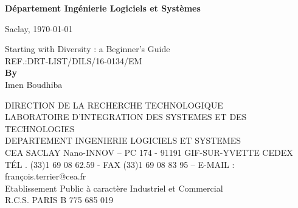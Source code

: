 \begin{titlepage}

\newcommand{\HRule}{\rule{\linewidth}{0.5mm}}



\bigskip
\bigskip


\begin{center}

\textbf{\LARGE Département Ingénierie Logiciels et Systèmes}\\[1.0cm] 

\begin{flushright}
Saclay, \today \\[1.0cm]
\end{flushright}

\LARGE Starting with Diversity : a Beginner's Guide \\[1.0cm]


\textsc{\Large REF.:DRT-LIST/DILS/16-0134/EM} \\[1.0cm]

\Large
\textbf{By}\\
Imen Boudhiba \\
\end{center}




\newenvironment{bottompar}{\par\vspace*{\fill}}{\clearpage}
\begin{bottompar}
\begin{center}
\textcolor{light-gray}{
\footnotesize
DIRECTION DE LA RECHERCHE TECHNOLOGIQUE\\
LABORATOIRE D'INTEGRATION DES SYSTEMES ET DES TECHNOLOGIES\\
DEPARTEMENT INGENIERIE LOGICIELS ET SYSTEMES\\
CEA SACLAY Nano-INNOV – PC 174 - 91191 GIF-SUR-YVETTE CEDEX\\
TÉL . (33)1 69 08 62.59 - FAX (33)1 69 08 83 95 – E-MAIL : françois.terrier@cea.fr\\
Etablissement Public à caractère Industriel et Commercial\\
R.C.S. PARIS B 775 685 019\\
}
\end{center}
\end{bottompar}
\normalsize

\vfill %

\end{titlepage}
